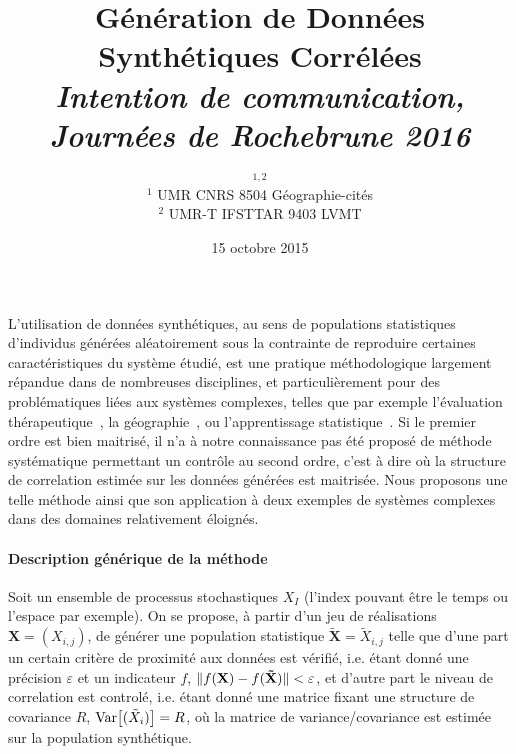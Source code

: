 


\title{\vspace{-2cm}Génération de Données Synthétiques Corrélées\\\medskip
\textit{Intention de communication, Journées de Rochebrune 2016}
}
\author{$^{1,2}$\\
$^{1}$ UMR CNRS 8504 Géographie-cités\\
$^{2}$ UMR-T IFSTTAR 9403 LVMT
}
\date{15 octobre 2015}


\maketitle

\justify

\vspace{-0.5cm}

L'utilisation de données synthétiques, au sens de populations statistiques d'individus générées aléatoirement sous la contrainte de reproduire certaines caractéristiques du système étudié, est une pratique méthodologique largement répandue dans de nombreuses disciplines, et particulièrement pour des problématiques liées aux systèmes complexes, telles que par exemple l'évaluation thérapeutique~\cite{abadie2010synthetic}, la géographie~\cite{moeckel2003creating}, ou l'apprentissage statistique~\cite{bolon2013review}. Si le premier ordre est bien maitrisé, il n'a à notre connaissance pas été proposé de méthode systématique permettant un contrôle au second ordre, c'est à dire où la structure de correlation estimée sur les données générées est maitrisée. Nous proposons une telle méthode ainsi que son application à deux exemples de systèmes complexes dans des domaines relativement éloignés.

\vspace{-0.4cm}
\paragraph{Description générique de la méthode}

Soit un ensemble de processus stochastiques $X_I$ (l'index pouvant être le temps ou l'espace par exemple). On se propose, à partir d'un jeu de réalisations $\mathbf{X}=(X_{i,j})$, de générer une population statistique $\mathbf{\tilde{X}}=\tilde{X}_{i,j}$ telle que d'une part un certain critère de proximité aux données est vérifié, i.e. étant donné une précision $\varepsilon$ et un indicateur $f$, $\| f(\mathbf{X})-f(\mathbf{\tilde{X}}) \| < \varepsilon$, et d'autre part le niveau de correlation est controlé, i.e. étant donné une matrice fixant une structure de covariance $R$, $\operatorname{Var}\!\left[(\tilde{X}_i)\right] = R$, où la matrice de variance/covariance est estimée sur la population synthétique.


